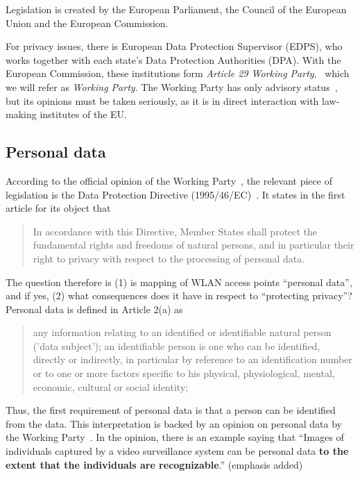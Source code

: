 \documentclass[12pt,a4paper,oneside,pdftex]{report}
\begin{document}
Legislation is created by the European Parliament, the Council of the European Union and the European Commission.~\cite{eu_institutions}

For privacy issues, there is European Data Protection Supervisor (EDPS), who works together with each state's Data Protection Authorities (DPA). With the European Commission, these institutions form \emph{Article 29 Working Party},~\cite{wp29_rules} which we will refer as \emph{Working Party}. The Working Party has only advisory status~\cite{wp29_rules}, but its opinions must be taken seriously, as it is in direct interaction with law-making institutes of the EU.

\subsection{Personal data}
\label{subsec:eu:personal_data}

According to the official opinion of the Working Party~\cite{wp29_185}, the relevant piece of legislation is the Data Protection Directive (1995/46/EC)~\cite{data_protection}. It states in the first article for its object that

\begin{quote}
    In accordance with this Directive, Member States shall protect the fundamental rights and freedoms of natural persons, and in particular their right to privacy with respect to the processing of personal data.
\end{quote}

The question therefore is (1) is mapping of WLAN access points ``personal data'', and if yes, (2) what consequences does it have in respect to ``protecting privacy''? Personal data is defined in Article 2(a) as

\begin{quote}
    any information relating to an identified or identifiable natural person ('data subject'); an identifiable person is one who can be identified, directly or indirectly, in particular by reference to an identification number or to one or more factors specific to his physical, physiological, mental, economic, cultural or social identity;
\end{quote}

Thus, the first requirement of personal data is that a person can be identified from the data. This interpretation is backed by an opinion on personal data by the Working Party~\cite{wp29_136}. In the opinion, there is an example saying that ``Images of individuals captured by a video surveillance system can be personal data \textbf{to the extent that the individuals are recognizable}.'' (emphasis added)
\end{document}
